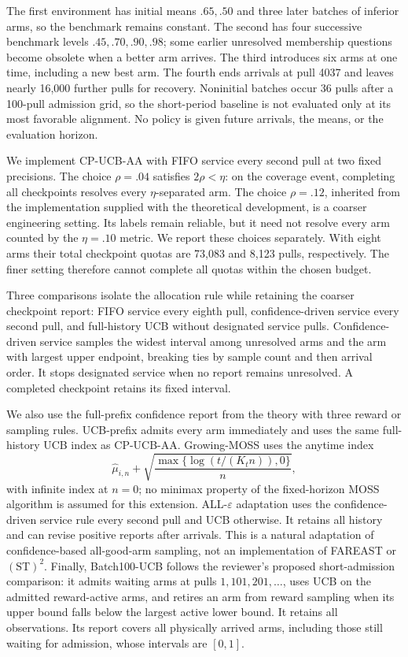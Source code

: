 \documentclass[11pt]{article}
\begin{document}
The first environment has initial means $.65,.50$ and three later batches of
inferior arms, so the benchmark remains constant. The second has four
successive benchmark levels $.45,.70,.90,.98$; some earlier unresolved
membership questions become obsolete when a better arm arrives. The third
introduces six arms at one time, including a new best arm. The fourth ends
arrivals at pull 4037 and leaves nearly 16,000 further pulls for recovery.
Noninitial batches occur 36 pulls after a 100-pull admission grid, so the
short-period baseline is not evaluated only at its most favorable alignment.
No policy is given future arrivals, the means, or the evaluation horizon.

We implement CP-UCB-AA with FIFO service every second pull at two fixed
precisions. The choice $\rho=.04$ satisfies $2\rho<\eta$: on the coverage
event, completing all checkpoints resolves every $\eta$-separated arm.
The choice $\rho=.12$, inherited from the implementation supplied with the
theoretical development, is a coarser engineering setting. Its labels remain
reliable, but it need not resolve every arm counted by the $\eta=.10$ metric.
We report these choices separately. With eight arms their total checkpoint
quotas are 73,083 and 8,123 pulls, respectively. The finer setting therefore
cannot complete all quotas within the chosen budget.

Three comparisons isolate the allocation rule while retaining the coarser
checkpoint report: FIFO service every eighth pull, confidence-driven service
every second pull, and full-history UCB without designated service pulls.
Confidence-driven service samples the widest interval among unresolved arms
and the arm with largest upper endpoint, breaking ties by sample count and
then arrival order. It stops designated service when no report remains
unresolved. A completed checkpoint retains its fixed interval.

We also use the full-prefix confidence report from the theory with three
reward or sampling rules. UCB-prefix admits every arm immediately and uses
the same full-history UCB index as CP-UCB-AA. Growing-MOSS uses the anytime
index
\[
 \widehat\mu_{i,n}
 +\sqrt{\frac{\max\{\log(t/(K_tn)),0\}}{n}},
\]
with infinite index at $n=0$; no minimax property of the fixed-horizon MOSS
algorithm is assumed for this extension. ALL-$\varepsilon$ adaptation uses
the confidence-driven service rule every second pull and UCB otherwise.
It retains all history and can revise positive reports after arrivals.
This is a natural adaptation of confidence-based all-good-arm sampling,
not an implementation of FAREAST or $(\mathrm{ST})^2$.
Finally, Batch100-UCB follows the reviewer's proposed short-admission
comparison: it admits waiting arms at pulls $1,101,201,\ldots$, uses UCB on
the admitted reward-active arms, and retires an arm from reward sampling when
its upper bound falls below the largest active lower bound. It retains all
observations. Its report covers all physically arrived arms, including those
still waiting for admission, whose intervals are $[0,1]$.
\end{document}
